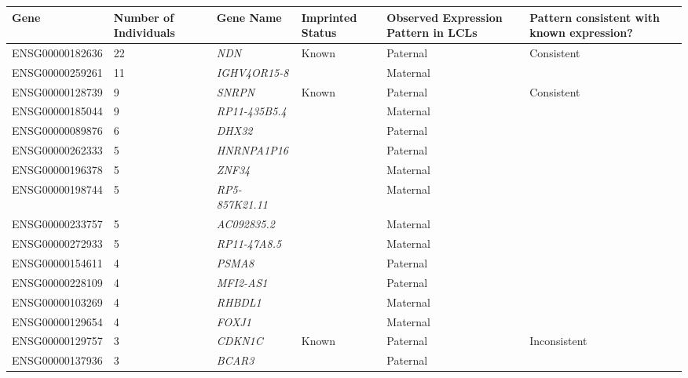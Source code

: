 \begin{table}[!htb]
\centering
\begin{adjustbox}{width={\textwidth}}
\begin{tabular}{@{}p{4cm}p{3cm}p{3cm}p{3cm}p{3cm}p{3cm}@{}}
\toprule Gene & 	Number of \newline Individuals & 	Gene Name&	Imprinted \newline Status	&Observed \newline Expression \newline Pattern \newline in LCLs	&Pattern \newline consistent with \newline known \newline expression? \\ \midrule
ENSG00000182636 & 22 & \emph{NDN} & Known & Paternal & Consistent\\ \hline
ENSG00000259261 & 11 & \emph{IGHV4OR15-8} & &  Maternal &   \\ \hline
ENSG00000128739 & 9 & \emph{SNRPN} & Known & Paternal & Consistent\\ \hline
ENSG00000185044 & 9 & \emph{RP11-435B5.4} & &  Maternal &   \\ \hline
ENSG00000089876 & 6 & \emph{DHX32} & &  Paternal &   \\ \hline
ENSG00000262333 & 5 & \emph{HNRNPA1P16} & &  Paternal &   \\ \hline
ENSG00000196378 & 5 & \emph{ZNF34} & &  Maternal &   \\ \hline
ENSG00000198744 & 5 & \emph{RP5-857K21.11} & &  Maternal &   \\ \hline
ENSG00000233757 & 5 & \emph{AC092835.2} & &  Maternal &   \\ \hline
ENSG00000272933 & 5 & \emph{RP11-47A8.5} & &  Maternal &   \\ \hline
ENSG00000154611 & 4 & \emph{PSMA8}& &  Paternal &   \\ \hline
ENSG00000228109 & 4 & \emph{MFI2-AS1} & &  Paternal &   \\ \hline
ENSG00000103269 & 4 & \emph{RHBDL1} & &  Maternal &   \\ \hline
ENSG00000129654 & 4 & \emph{FOXJ1} & &  Maternal &  \\ \hline
ENSG00000129757 & 3 & \emph{CDKN1C} & Known & Paternal & Inconsistent\\ \hline
ENSG00000137936 & 3 & \emph{BCAR3}& &  Paternal &   \\ \hline

\end{tabular}
\end{adjustbox}
\end{table}
